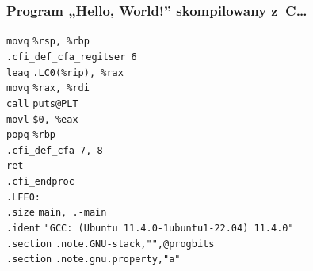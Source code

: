 \documentclass[10pt,t]{beamer}
\begin{document}
\begin{frame}
  \frametitle{Program „Hello, World!” skompilowany z~C\ldots}


  \hphantom{aaaaa} \texttt{movq} \hphantom{aaa} \texttt{\%rsp, \%rbp} \\
  \hphantom{aaaaa} \texttt{.cfi\_def\_cfa\_regitser 6} \\
  \hphantom{aaaaa} \texttt{leaq} \hphantom{aaa}
  \texttt{.LC0(\%rip), \%rax} \\
  \hphantom{aaaaa} \texttt{movq} \hphantom{aaa} \texttt{\%rax, \%rdi} \\
  \hphantom{aaaaa} \texttt{call} \hphantom{aaa} \texttt{puts@PLT} \\
  \hphantom{aaaaa} \texttt{movl} \hphantom{aaa} \texttt{\$0, \%eax} \\
  \hphantom{aaaaa} \texttt{popq} \hphantom{aaa} \texttt{\%rbp} \\
  \hphantom{aaaaa} \texttt{.cfi\_def\_cfa 7, 8} \\
  \hphantom{aaaaa} \texttt{ret} \\
  \hphantom{aaaaa} \texttt{.cfi\_endproc} \\
  \texttt{.LFE0:} \\
  \hphantom{aaaaa} \texttt{.size} \hphantom{aaa} \texttt{main, .-main} \\
  \hphantom{aaaaa} \texttt{.ident} \hphantom{aa}
  \texttt{"GCC: (Ubuntu 11.4.0-1ubuntu1-22.04) 11.4.0"} \\
  \hphantom{aaaaa} \texttt{.section} \hphantom{aaaaaa}
  \texttt{.note.GNU-stack,"",@progbits} \\
  \hphantom{aaaaa} \texttt{.section} \hphantom{aaaaaa}
  \texttt{.note.gnu.property,"a"}

\end{frame}
\end{document}

